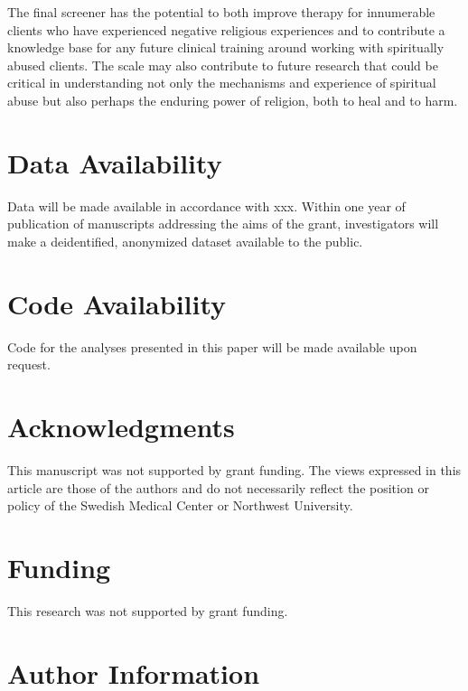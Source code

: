 \documentclass[
]{article}
\begin{document}
The final screener has the potential to both improve therapy for innumerable clients who have experienced negative religious experiences and to contribute a knowledge base for any future clinical training around working with spiritually abused clients. The scale may also contribute to future research that could be critical in understanding not only the mechanisms and experience of spiritual abuse but also perhaps the enduring power of religion, both to heal and to harm.

\hypertarget{data-availability}{%
\section{Data Availability}\label{data-availability}}

Data will be made available in accordance with xxx. Within one year of publication of manuscripts addressing the aims of the grant, investigators will make a deidentified, anonymized dataset available to the public.

\hypertarget{code-availability}{%
\section{Code Availability}\label{code-availability}}

Code for the analyses presented in this paper will be made available upon request.

\hypertarget{acknowledgments}{%
\section{Acknowledgments}\label{acknowledgments}}

This manuscript was not supported by grant funding. The views expressed in this article are those of the authors and do not necessarily reflect the position or policy of the Swedish Medical Center or Northwest University.

\hypertarget{funding}{%
\section{Funding}\label{funding}}

This research was not supported by grant funding.

\hypertarget{author-information}{%
\section{Author Information}\label{author-information}}
\end{document}
